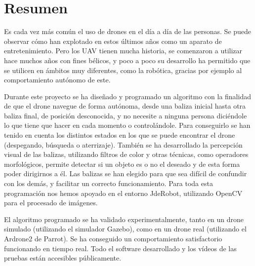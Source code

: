 \chapter*{Resumen}
\hspace{1cm} Es cada vez m\'as com\'un el uso de drones en el d\'ia a d\'ia de las personas. Se puede observar c\'omo han explotado en estos \'ultimos años como un aparato de entretenimiento. Pero los UAV tienen mucha historia, se comenzaron a utilizar hace muchos años con fines b\'elicos, y poco a poco su desarrollo ha permitido que se utilicen en \'ambitos muy diferentes, como la rob\'otica, gracias por ejemplo al comportamiento aut\'onomo de este.

\hspace{1cm} Durante este proyecto se ha diseñado y programado un algoritmo con la finalidad de que el drone navegue de forma aut\'onoma, desde una baliza inicial hasta otra baliza final, de posici\'on desconocida, y no necesite a ninguna persona dici\'endole lo que tiene que hacer en cada momento o control\'andole. Para conseguirlo se han tenido en cuenta los distintos estados en los que se puede encontrar el drone (despegando, b\'usqueda o aterrizaje).
Tambi\'en se ha desarrollado la percepci\'on visual de las balizas, utilizando filtros de color y otras t\'ecnicas, como operadores morfol\'ogicos, permite detectar si un objeto es o no el deseado y de esta forma poder dirigirnos a \'el. Las balizas se han elegido para que sea dif\'icil de confundir con los dem\'as, y facilitar un correcto funcionamiento. Para toda esta programaci\'on nos hemos apoyado en el entorno JdeRobot, utilizando OpenCV para el procesado de im\'agenes.

\hspace{1cm} El algoritmo programado se ha validado experimentalmente, tanto en un drone simulado (utilizando el simulador Gazebo), como en un drone real (utilizando el Ardrone2 de Parrot). Se ha conseguido un comportamiento satisfactorio funcionando en tiempo real. Todo el software desarrollado y los v\'ideos de las pruebas est\'an accesibles p\'ublicamente. 


